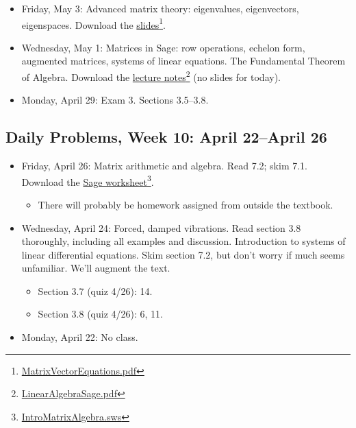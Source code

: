 \begin{itemize}
\item Friday, May 3: Advanced matrix theory: eigenvalues, eigenvectors, eigenspaces. Download the \href{MatrixVectorEquations.pdf}{slides}\footnote{\href{MatrixVectorEquations.pdf}{MatrixVectorEquations.pdf}}.

\item Wednesday, May 1: Matrices in Sage: row operations, echelon form, augmented matrices, systems of linear equations. The Fundamental Theorem of Algebra. Download the \href{LinearAlgebraSage.pdf}{lecture notes}\footnote{\href{LinearAlgebraSage.pdf}{LinearAlgebraSage.pdf}} (no slides for today).

\item Monday, April 29: Exam 3. Sections 3.5--3.8.

\end{itemize}

\subsection{Daily Problems, Week 10: April 22--April 26}
\label{dailyproblemsweek10:april22--april26}

\begin{itemize}
\item Friday, April 26: Matrix arithmetic and algebra. Read 7.2; skim 7.1. Download the \href{IntroMatrixAlgebra.sws}{Sage worksheet}\footnote{\href{IntroMatrixAlgebra.sws}{IntroMatrixAlgebra.sws}}.

\begin{itemize}
\item There will probably be homework assigned from outside the textbook.

\end{itemize}

\item Wednesday, April 24: Forced, damped vibrations. Read section 3.8 thoroughly, including all examples and discussion. Introduction to systems of linear differential equations. Skim section 7.2, but don't worry if much seems unfamiliar. We'll augment the text.

\begin{itemize}
\item Section 3.7 (quiz 4\slash 26): 14.

\item Section 3.8 (quiz 4\slash 26): 6, 11.

\end{itemize}

\item Monday, April 22: No class.

\end{itemize}

